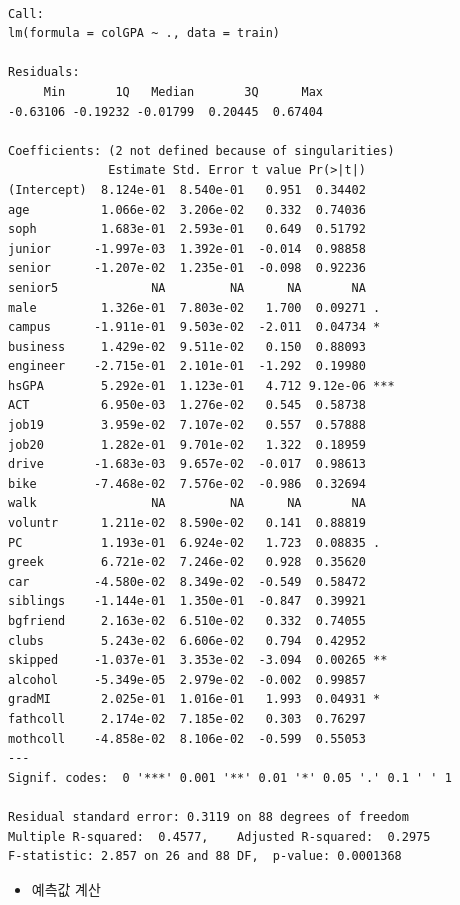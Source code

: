 \documentclass[
  letterpaper,
  DIV=11,
  numbers=noendperiod]{scrartcl}
\providecommand{\tightlist}{%
  \setlength{\itemsep}{0pt}\setlength{\parskip}{0pt}}\usepackage{longtable,booktabs,array}
\begin{document}
\begin{verbatim}

Call:
lm(formula = colGPA ~ ., data = train)

Residuals:
     Min       1Q   Median       3Q      Max 
-0.63106 -0.19232 -0.01799  0.20445  0.67404 

Coefficients: (2 not defined because of singularities)
              Estimate Std. Error t value Pr(>|t|)    
(Intercept)  8.124e-01  8.540e-01   0.951  0.34402    
age          1.066e-02  3.206e-02   0.332  0.74036    
soph         1.683e-01  2.593e-01   0.649  0.51792    
junior      -1.997e-03  1.392e-01  -0.014  0.98858    
senior      -1.207e-02  1.235e-01  -0.098  0.92236    
senior5             NA         NA      NA       NA    
male         1.326e-01  7.803e-02   1.700  0.09271 .  
campus      -1.911e-01  9.503e-02  -2.011  0.04734 *  
business     1.429e-02  9.511e-02   0.150  0.88093    
engineer    -2.715e-01  2.101e-01  -1.292  0.19980    
hsGPA        5.292e-01  1.123e-01   4.712 9.12e-06 ***
ACT          6.950e-03  1.276e-02   0.545  0.58738    
job19        3.959e-02  7.107e-02   0.557  0.57888    
job20        1.282e-01  9.701e-02   1.322  0.18959    
drive       -1.683e-03  9.657e-02  -0.017  0.98613    
bike        -7.468e-02  7.576e-02  -0.986  0.32694    
walk                NA         NA      NA       NA    
voluntr      1.211e-02  8.590e-02   0.141  0.88819    
PC           1.193e-01  6.924e-02   1.723  0.08835 .  
greek        6.721e-02  7.246e-02   0.928  0.35620    
car         -4.580e-02  8.349e-02  -0.549  0.58472    
siblings    -1.144e-01  1.350e-01  -0.847  0.39921    
bgfriend     2.163e-02  6.510e-02   0.332  0.74055    
clubs        5.243e-02  6.606e-02   0.794  0.42952    
skipped     -1.037e-01  3.353e-02  -3.094  0.00265 ** 
alcohol     -5.349e-05  2.979e-02  -0.002  0.99857    
gradMI       2.025e-01  1.016e-01   1.993  0.04931 *  
fathcoll     2.174e-02  7.185e-02   0.303  0.76297    
mothcoll    -4.858e-02  8.106e-02  -0.599  0.55053    
---
Signif. codes:  0 '***' 0.001 '**' 0.01 '*' 0.05 '.' 0.1 ' ' 1

Residual standard error: 0.3119 on 88 degrees of freedom
Multiple R-squared:  0.4577,    Adjusted R-squared:  0.2975 
F-statistic: 2.857 on 26 and 88 DF,  p-value: 0.0001368
\end{verbatim}

\begin{itemize}
\tightlist
\item
  예측값 계산
\end{itemize}
\end{document}
